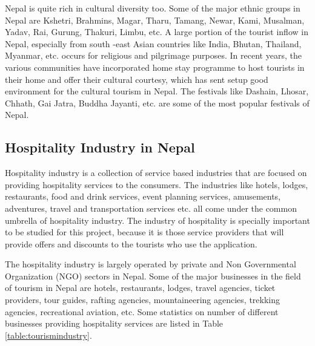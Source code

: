 \documentclass[12pt, a4paper, oneside]{article}
\begin{document}
Nepal is quite rich in cultural diversity too. Some of the major ethnic groups in Nepal are Kshetri, Brahmins, Magar, Tharu, Tamang, Newar, Kami, Musalman, Yadav, Rai, Gurung, Thakuri, Limbu, etc. A large portion of the tourist inflow in Nepal, especially from south -east Asian countries like India, Bhutan, Thailand, Myanmar, etc. occurs for religious and pilgrimage purposes. In recent years, the various communities have incorporated home stay programme to host tourists in their home and offer their cultural courtesy, which has sent setup good environment for the cultural tourism in Nepal. The festivals like Dashain, Lhosar, Chhath, Gai Jatra, Buddha Jayanti, etc. are some of the most popular festivals of Nepal.

\subsection{Hospitality Industry in Nepal}
Hospitality industry is a collection of service based industries that are focused on providing hospitality services to the consumers. The industries like hotels, lodges, restaurants, food and drink services, event planning services, amusements, adventures, travel and transportation services etc. all come under the common umbrella of hospitality industry. The industry of hospitality is specially important to be studied for this project, because it is those service providers that will provide offers and discounts to the tourists who use the application.

The hospitality industry is largely operated by private and Non Governmental Organization (NGO) sectors in Nepal. Some of the major businesses in the field of tourism in Nepal are hotels, restaurants, lodges, travel agencies, ticket providers, tour guides, rafting agencies, mountaineering agencies, trekking agencies, recreational aviation, etc. Some statistics on number of different businesses providing hospitality services are listed in Table \ref{table:tourismindustry}.
\end{document}
